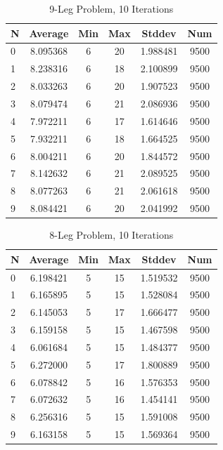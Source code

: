\documentclass{article}
\begin{document}
\begin{table}
\centering
\begin{tabular}{|l|c|c|c|c|c|}
\hline
N & Average & Min & Max & Stddev & Num \\
\hline
0 & 8.095368 & 6 & 20 & 1.988481 & 9500 \\ 
1 & 8.238316 & 6 & 18 & 2.100899 & 9500 \\ 
2 & 8.033263 & 6 & 20 & 1.907523 & 9500 \\ 
3 & 8.079474 & 6 & 21 & 2.086936 & 9500 \\ 
4 & 7.972211 & 6 & 17 & 1.614646 & 9500 \\ 
5 & 7.932211 & 6 & 18 & 1.664525 & 9500 \\ 
6 & 8.004211 & 6 & 20 & 1.844572 & 9500 \\ 
7 & 8.142632 & 6 & 21 & 2.089525 & 9500 \\ 
8 & 8.077263 & 6 & 21 & 2.061618 & 9500 \\ 
9 & 8.084421 & 6 & 20 & 2.041992 & 9500 \\ 
\hline
\end{tabular}
\caption{9-Leg Problem, 10 Iterations}
\label{tab:template}
\end{table}

\begin{table}
\centering
\begin{tabular}{|l|c|c|c|c|c|}
\hline
N & Average & Min & Max & Stddev & Num \\
\hline
0 & 6.198421 & 5 & 15 & 1.519532 & 9500 \\ 
1 & 6.165895 & 5 & 15 & 1.528084 & 9500 \\ 
2 & 6.145053 & 5 & 17 & 1.666477 & 9500 \\ 
3 & 6.159158 & 5 & 15 & 1.467598 & 9500 \\ 
4 & 6.061684 & 5 & 15 & 1.484377 & 9500 \\ 
5 & 6.272000 & 5 & 17 & 1.800889 & 9500 \\ 
6 & 6.078842 & 5 & 16 & 1.576353 & 9500 \\ 
7 & 6.072632 & 5 & 16 & 1.454141 & 9500 \\ 
8 & 6.256316 & 5 & 15 & 1.591008 & 9500 \\ 
9 & 6.163158 & 5 & 15 & 1.569364 & 9500 \\
\hline
\end{tabular}
\caption{8-Leg Problem, 10 Iterations}
\label{tab:template}
\end{table}
\end{document}
